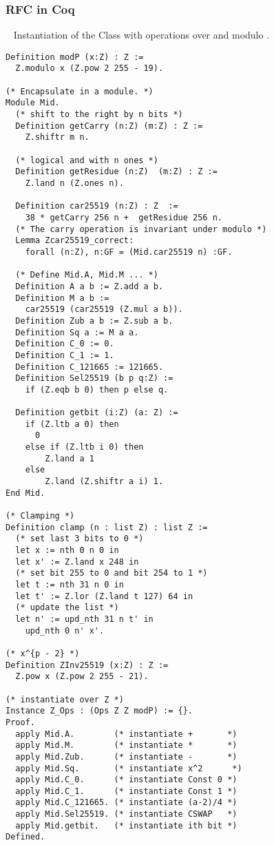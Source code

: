 \subsubsection{RFC in Coq}
\label{subsubsec:RFC-Coq}
~
Instantiation of the Class  with operations over \Z and modulo \p.
\begin{lstlisting}[language=Coq]
Definition modP (x:Z) : Z :=
  Z.modulo x (Z.pow 2 255 - 19).

(* Encapsulate in a module. *)
Module Mid.
  (* shift to the right by n bits *)
  Definition getCarry (n:Z) (m:Z) : Z :=
    Z.shiftr m n.

  (* logical and with n ones *)
  Definition getResidue (n:Z)  (m:Z) : Z :=
    Z.land n (Z.ones n).

  Definition car25519 (n:Z) : Z  :=
    38 * getCarry 256 n +  getResidue 256 n.
  (* The carry operation is invariant under modulo *)
  Lemma Zcar25519_correct:
    forall (n:Z), n:GF = (Mid.car25519 n) :GF.

  (* Define Mid.A, Mid.M ... *)
  Definition A a b := Z.add a b.
  Definition M a b :=
    car25519 (car25519 (Z.mul a b)).
  Definition Zub a b := Z.sub a b.
  Definition Sq a := M a a.
  Definition C_0 := 0.
  Definition C_1 := 1.
  Definition C_121665 := 121665.
  Definition Sel25519 (b p q:Z) :=
    if (Z.eqb b 0) then p else q.

  Definition getbit (i:Z) (a: Z) :=
    if (Z.ltb a 0) then
      0
    else if (Z.ltb i 0) then
        Z.land a 1
    else
        Z.land (Z.shiftr a i) 1.
End Mid.

(* Clamping *)
Definition clamp (n : list Z) : list Z :=
  (* set last 3 bits to 0 *)
  let x := nth 0 n 0 in
  let x' := Z.land x 248 in
  (* set bit 255 to 0 and bit 254 to 1 *)
  let t := nth 31 n 0 in
  let t' := Z.lor (Z.land t 127) 64 in
  (* update the list *)
  let n' := upd_nth 31 n t' in
    upd_nth 0 n' x'.

(* x^{p - 2} *)
Definition ZInv25519 (x:Z) : Z :=
  Z.pow x (Z.pow 2 255 - 21).

(* instantiate over Z *)
Instance Z_Ops : (Ops Z Z modP) := {}.
Proof.
  apply Mid.A.        (* instantiate +       *)
  apply Mid.M.        (* instantiate *       *)
  apply Mid.Zub.      (* instantiate -       *)
  apply Mid.Sq.       (* instantiate x^2      *)
  apply Mid.C_0.      (* instantiate Const 0 *)
  apply Mid.C_1.      (* instantiate Const 1 *)
  apply Mid.C_121665. (* instantiate (a-2)/4 *)
  apply Mid.Sel25519. (* instantiate CSWAP   *)
  apply Mid.getbit.   (* instantiate ith bit *)
Defined.


\end{lstlisting}
